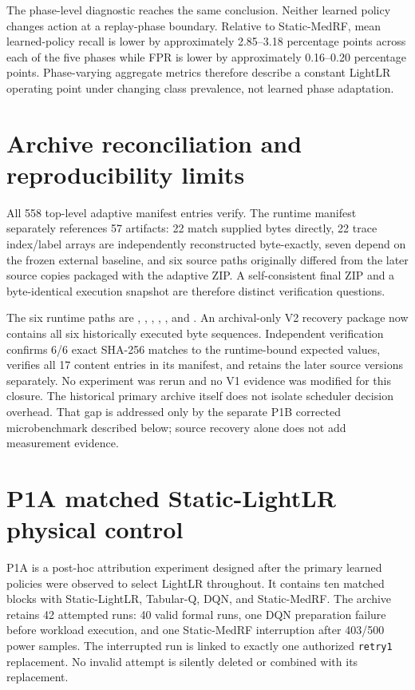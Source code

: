 \documentclass[10pt,a4paper]{article}
\begin{document}
The phase-level diagnostic reaches the same conclusion. Neither learned policy changes action at a replay-phase boundary. Relative to Static-MedRF, mean learned-policy recall is lower by approximately 2.85--3.18 percentage points across each of the five phases while FPR is lower by approximately 0.16--0.20 percentage points. Phase-varying aggregate metrics therefore describe a constant LightLR operating point under changing class prevalence, not learned phase adaptation.

\section{Archive reconciliation and reproducibility limits}
All 558 top-level adaptive manifest entries verify. The runtime manifest separately references 57 artifacts: 22 match supplied bytes directly, 22 trace index/label arrays are independently reconstructed byte-exactly, seven depend on the frozen external baseline, and six source paths originally differed from the later source copies packaged with the adaptive ZIP. A self-consistent final ZIP and a byte-identical execution snapshot are therefore distinct verification questions.

The six runtime paths are , , , , , and . An archival-only V2 recovery package now contains all six historically executed byte sequences. Independent verification confirms 6/6 exact SHA-256 matches to the runtime-bound expected values, verifies all 17 content entries in its manifest, and retains the later source versions separately. No experiment was rerun and no V1 evidence was modified for this closure. The historical primary archive itself does not isolate scheduler decision overhead. That gap is addressed only by the separate P1B corrected microbenchmark described below; source recovery alone does not add measurement evidence.

\section{P1A matched Static-LightLR physical control}
P1A is a post-hoc attribution experiment designed after the primary learned policies were observed to select LightLR throughout. It contains ten matched blocks with Static-LightLR, Tabular-Q, DQN, and Static-MedRF. The archive retains 42 attempted runs: 40 valid formal runs, one DQN preparation failure before workload execution, and one Static-MedRF interruption after 403/500 power samples. The interrupted run is linked to exactly one authorized \texttt{retry1} replacement. No invalid attempt is silently deleted or combined with its replacement.
\end{document}
